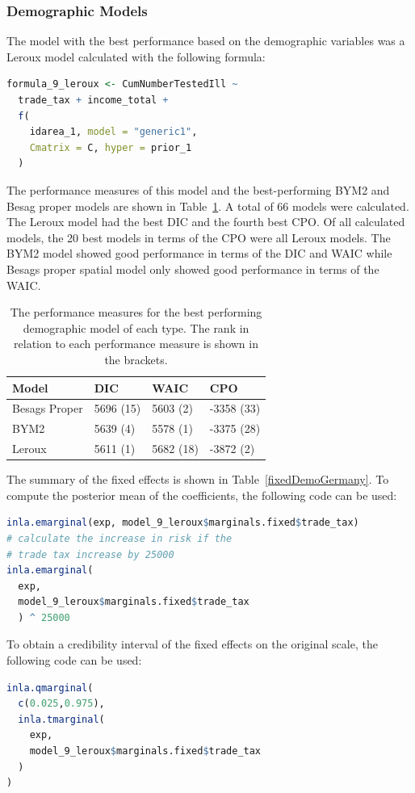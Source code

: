 \subsubsection{Demographic Models}
The model with the best performance based on the demographic variables was a Leroux model calculated with the following formula:
\begin{lstlisting}[language=R]
formula_9_leroux <- CumNumberTestedIll ~
  trade_tax + income_total +
  f(
    idarea_1, model = "generic1",
    Cmatrix = C, hyper = prior_1
  )
\end{lstlisting}
The performance measures of this model and the best-performing BYM2 and Besag proper models are shown in Table~\ref{demoGermany}. A total of 66 models were calculated. The Leroux model had the best DIC and the fourth best CPO. Of all calculated models, the 20 best models in terms of the CPO were all Leroux models. The BYM2 model showed good performance in terms of the DIC and WAIC while Besags proper spatial model only showed good performance in terms of the WAIC.
\begin{table}[H] 
\caption{The performance measures for the best performing demographic model of each type. The rank in relation to each performance measure is shown in the brackets. \label{demoGermany}}
\begin{tabular}{l l l l}
\toprule
\textbf{Model}	& \textbf{DIC}	& \textbf{WAIC} & \textbf{CPO} \\
\midrule
Besags Proper  & 5696 (15) & 5603 (2) & -3358 (33) \\
BYM2 & 5639 (4) & 5578 (1) & -3375 (28)\\
Leroux & 5611 (1) & 5682 (18) & -3872 (2) \\
\bottomrule
\end{tabular}
\end{table}
The summary of the fixed effects is shown in Table~\ref{fixedDemoGermany}. To compute the posterior mean of the coefficients, the following code can be used:
\begin{lstlisting}[language=R]
inla.emarginal(exp, model_9_leroux$marginals.fixed$trade_tax)
# calculate the increase in risk if the 
# trade tax increase by 25000
inla.emarginal(
  exp,
  model_9_leroux$marginals.fixed$trade_tax
  ) ^ 25000
\end{lstlisting}
To obtain a credibility interval of the fixed effects on the original scale, the following code can be used:
\begin{lstlisting}[language=R]
inla.qmarginal(
  c(0.025,0.975),
  inla.tmarginal(
    exp,
    model_9_leroux$marginals.fixed$trade_tax
  )
)
\end{lstlisting}
